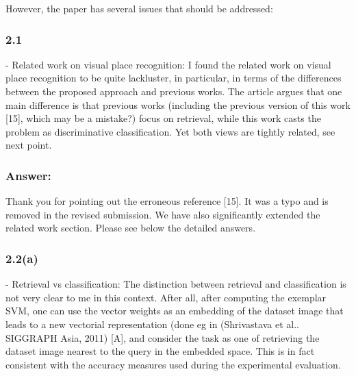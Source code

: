 \documentclass[a4paper,12pt]{article}
\begin{document}
However, the paper has several issues that should be addressed:
\subsubsection*{2.1}
- Related work on visual place recognition: I found the related work on visual place recognition to be quite lackluster, in particular, in terms of the differences between the proposed approach and previous works. The article argues that one main difference is that previous works (including the previous version of this work [15], which may be a mistake?) focus on retrieval, while this work casts the problem as discriminative classification. Yet both views are tightly related, see next point.

\subsubsection*{Answer:}  Thank you for pointing out the erroneous reference [15]. It was a typo and is removed in the revised submission. We have also significantly extended the related work section. Please see below the detailed answers.

\subsubsection*{2.2(a)}
- Retrieval vs classification: The distinction between retrieval and classification is not very clear to me in this context. After all, after computing the exemplar SVM, one can use the vector weights as an embedding of the dataset image that leads to a new vectorial representation (done eg in (Shrivastava et al.. SIGGRAPH Asia, 2011) [A], and consider the task as one of retrieving the dataset image nearest to the query in the embedded space. This is in fact consistent with the accuracy measures used during the experimental evaluation.
\end{document}
